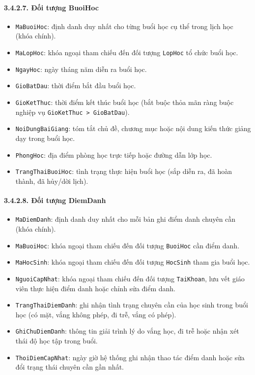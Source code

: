 \paragraph{3.4.2.7. Đối tượng BuoiHoc}\mbox{}
\begin{itemize}\setlength{\itemsep}{2pt}\setlength{\parskip}{0pt}
    \item \texttt{MaBuoiHoc}: định danh duy nhất cho từng buổi học cụ thể trong lịch học (khóa chính).
    \item \texttt{MaLopHoc}: khóa ngoại tham chiếu đến đối tượng \texttt{LopHoc} tổ chức buổi học.
    \item \texttt{NgayHoc}: ngày tháng năm diễn ra buổi học.
    \item \texttt{GioBatDau}: thời điểm bắt đầu buổi học.
    \item \texttt{GioKetThuc}: thời điểm kết thúc buổi học (bắt buộc thỏa mãn ràng buộc nghiệp vụ \texttt{GioKetThuc > GioBatDau}).
    \item \texttt{NoiDungBaiGiang}: tóm tắt chủ đề, chương mục hoặc nội dung kiến thức giảng dạy trong buổi học.
    \item \texttt{PhongHoc}: địa điểm phòng học trực tiếp hoặc đường dẫn lớp học.
    \item \texttt{TrangThaiBuoiHoc}: tình trạng thực hiện buổi học (sắp diễn ra, đã hoàn thành, đã hủy/dời lịch).
\end{itemize}

\paragraph{3.4.2.8. Đối tượng DiemDanh}\mbox{}
\begin{itemize}\setlength{\itemsep}{2pt}\setlength{\parskip}{0pt}
    \item \texttt{MaDiemDanh}: định danh duy nhất cho mỗi bản ghi điểm danh chuyên cần (khóa chính).
    \item \texttt{MaBuoiHoc}: khóa ngoại tham chiếu đến đối tượng \texttt{BuoiHoc} cần điểm danh.
    \item \texttt{MaHocSinh}: khóa ngoại tham chiếu đến đối tượng \texttt{HocSinh} tham gia buổi học.
    \item \texttt{NguoiCapNhat}: khóa ngoại tham chiếu đến đối tượng \texttt{TaiKhoan}, lưu vết giáo viên thực hiện điểm danh hoặc chỉnh sửa điểm danh.
    \item \texttt{TrangThaiDiemDanh}: ghi nhận tình trạng chuyên cần của học sinh trong buổi học (có mặt, vắng không phép, đi trễ, vắng có phép).
    \item \texttt{GhiChuDiemDanh}: thông tin giải trình lý do vắng học, đi trễ hoặc nhận xét thái độ học tập trong buổi.
    \item \texttt{ThoiDiemCapNhat}: ngày giờ hệ thống ghi nhận thao tác điểm danh hoặc sửa đổi trạng thái chuyên cần gần nhất.
\end{itemize}

